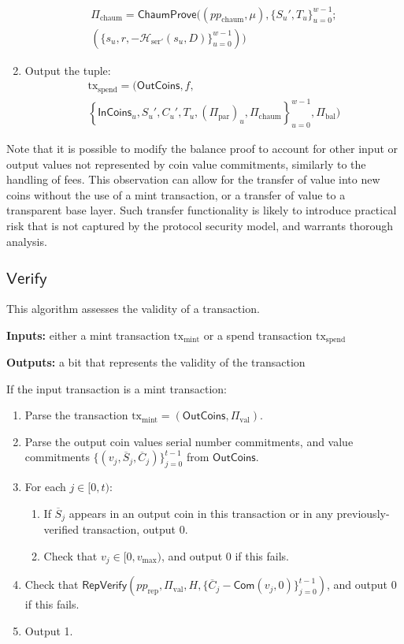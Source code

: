 \documentclass{llncs}
\newcommand{\hash}{\mathcal{H}}
\newcommand{\func}[1]{\mathsf{#1}}
\newcommand{\com}{\func{Com}}
\begin{document}
\begin{enumerate}
    \begin{multline*}
    \Pi_{\text{chaum}} = \func{ChaumProve}((pp_{\text{chaum}}, \mu), \{S_u', T_u\}_{u=0}^{w-1}; \\
    (\{s_u, r, -\hash_{\text{ser}'}(s_u, D)\}_{u=0}^{w-1}))
    \end{multline*}
    \item Output the tuple:
    \begin{multline*}
    \text{tx}_{\text{spend}} = ( \func{OutCoins}, f, \\
    \left\{ \func{InCoins}_u, S_u', C_u', T_u, (\Pi_{\text{par}})_u, \Pi_{\text{chaum}} \right\}_{u=0}^{w-1}, \Pi_{\text{bal}} )
    \end{multline*}
\end{enumerate}
Note that it is possible to modify the balance proof to account for other input or output values not represented by coin value commitments, similarly to the handling of fees.
This observation can allow for the transfer of value into new coins without the use of a mint transaction, or a transfer of value to a transparent base layer.
Such transfer functionality is likely to introduce practical risk that is not captured by the protocol security model, and warrants thorough analysis.


\subsection{\texorpdfstring{$\func{Verify}$}{Verify}}

This algorithm assesses the validity of a transaction.

\textbf{Inputs:} either a mint transaction $\text{tx}_{\text{mint}}$ or a spend transaction $\text{tx}_{\text{spend}}$

\textbf{Outputs:} a bit that represents the validity of the transaction

If the input transaction is a mint transaction:
\begin{enumerate}
    \item Parse the transaction $\text{tx}_{\text{mint}} = (\func{OutCoins}, \Pi_{\text{val}})$.
    \item Parse the output coin values serial number commitments, and value commitments $\{(v_j, \overline{S}_j, \overline{C}_j)\}_{j=0}^{t-1}$ from $\func{OutCoins}$.
    \item For each $j \in [0,t)$:
    \begin{enumerate}
        \item If $\overline{S}_j$ appears in an output coin in this transaction or in any previously-verified transaction, output 0.
        \item Check that $v_j \in [0,v_{\text{max}})$, and output 0 if this fails.
    \end{enumerate}
    \item Check that $\func{RepVerify}\left( pp_{\text{rep}}, \Pi_{\text{val}}, H, \{\overline{C}_j - \com(v_j, 0)\}_{j=0}^{t-1} \right)$, and output 0 if this fails.
    \item Output 1.
\end{enumerate}
\end{document}
